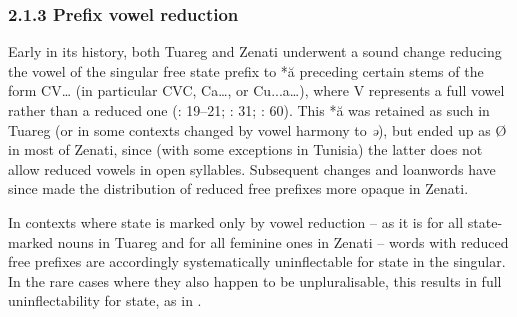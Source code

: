 \documentclass[output=paper]{langscibook}
\begin{document}
\subsubsection{2.1.3 Prefix vowel reduction}
\begin{styleStandarduser}
Early in its history, both Tuareg and Zenati underwent a sound change reducing the vowel of the singular free state prefix to *ă preceding certain stems of the form CV… (in particular CVC, Ca…, or Cu...a…), where V represents a full vowel rather than a reduced one (\citealt{Prasse1974}: 19–21; \citealt{Kossmann1999}: 31; \citealt{Brugnatelli2006}: 60). This *ă was retained as such in Tuareg (or in some contexts changed by vowel harmony to \textit{ə}), but ended up as Ø in most of Zenati, since (with some exceptions in Tunisia) the latter does not allow reduced vowels in open syllables. Subsequent changes and loanwords have since made the distribution of reduced free prefixes more opaque in Zenati.
\end{styleStandarduser}

\begin{styleStandarduser}
In contexts where state is marked only by vowel reduction – as it is for all state-marked nouns in Tuareg and for all feminine ones in Zenati – words with reduced free prefixes are accordingly systematically uninflectable for state in the singular. In the rare cases where they also happen to be unpluralisable, this results in full uninflectability for state, as in .
\end{styleStandarduser}

\begin{styleLangsciTableHeading}%
\begin{table}
\caption{Nouns uninflectable due to originally phonologically conditioned prefix vowel reduction}
\label{tab:key:5}
\end{table}\end{styleLangsciTableHeading}
\end{document}
